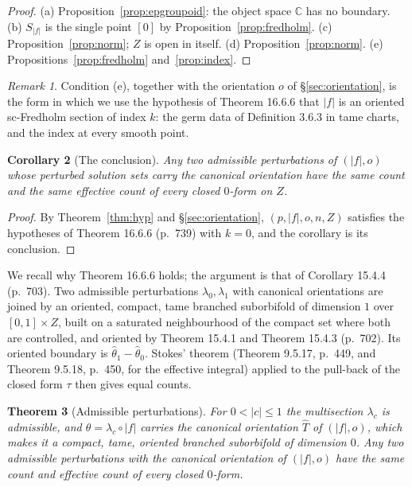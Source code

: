 \documentclass[11pt,a4paper]{article}
\theoremstyle{plain}
\newtheorem{theorem}{Theorem}[section]
\newtheorem{corollary}[theorem]{Corollary}
\theoremstyle{definition}
\theoremstyle{remark}
\newtheorem{remark}[theorem]{Remark}
\newcommand{\C}{\mathbb{C}}
\newcommand{\abs}[1]{\lvert #1\rvert}
\begin{document}
\begin{proof}
(a) Proposition~\ref{prop:epgroupoid}: the object space $\C$ has no boundary. (b) $S_{\abs f}$ is the
single point $[0]$ by Proposition~\ref{prop:fredholm}. (c) Proposition~\ref{prop:norm}; $Z$ is open in
itself. (d) Proposition~\ref{prop:norm}. (e) Propositions~\ref{prop:fredholm} and~\ref{prop:index}.
\end{proof}

\begin{remark}\label{rem:hyp}
Condition (e), together with the orientation $o$ of \S\ref{sec:orientation}, is the form in which we use
the hypothesis of Theorem 16.6.6 that $\abs f$ is an oriented sc-Fredholm section of index $k$: the germ
data of Definition 3.6.3 in tame charts, and the index at every smooth point.
\end{remark}

\begin{corollary}[The conclusion]\label{thm:conclusion}
Any two admissible perturbations of $(\abs f,o)$ whose perturbed solution sets carry the canonical
orientation have the same count and the same effective count of every closed $0$-form on $Z$.
\end{corollary}

\begin{proof}
By Theorem~\ref{thm:hyp} and \S\ref{sec:orientation}, $(p,\abs f,o,n,Z)$ satisfies the hypotheses of
Theorem 16.6.6 (p.~739) with $k=0$, and the corollary is its conclusion.
\end{proof}

We recall why Theorem 16.6.6 holds; the argument is that of Corollary 15.4.4 (p.~703). Two admissible
perturbations $\lambda_0,\lambda_1$ with canonical orientations are joined by an oriented, compact, tame
branched suborbifold of dimension $1$ over $[0,1]\times Z$, built on a saturated neighbourhood of the
compact set where both are controlled, and oriented by Theorem 15.4.1 and Theorem 15.4.3 (p.~702). Its
oriented boundary is $\hat\theta_1-\hat\theta_0$. Stokes' theorem (Theorem 9.5.17, p.~449, and
Theorem 9.5.18, p.~450, for the effective integral) applied to the pull-back of the closed form $\tau$
then gives equal counts.

\begin{theorem}[Admissible perturbations]\label{thm:admissible}
For $0<\abs c\le1$ the multisection $\lambda_c$ is admissible, and $\theta=\lambda_c\circ\abs f$ carries the
canonical orientation $\hat T$ of $(\abs f,o)$, which makes it a compact, tame, oriented branched
suborbifold of dimension $0$. Any two admissible perturbations with the canonical orientation of
$(\abs f,o)$ have the same count and effective count of every closed $0$-form.
\end{theorem}
\end{document}
